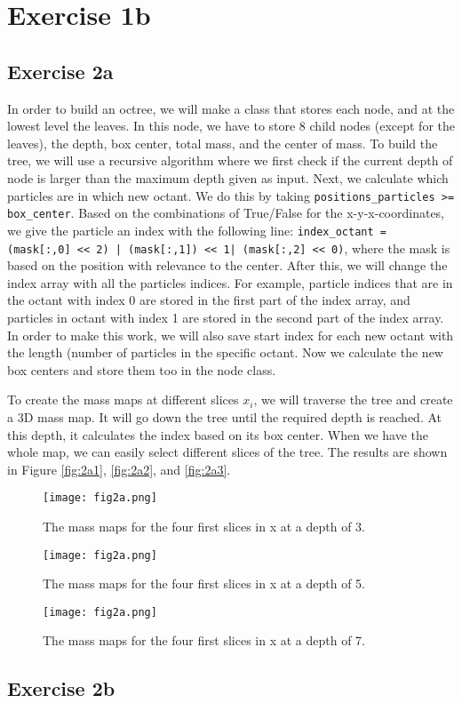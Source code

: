 \section{Exercise 1b}

\subsection{Exercise 2a}
In order to build an octree, we will make a class that stores each node, and at the lowest level the leaves. In this node, we have to store 8 child nodes (except for the leaves), the depth, box center, total mass, and the center of mass. To build the tree, we will use a recursive algorithm where we first check if the current depth of node is larger than the maximum depth given as input. Next, we calculate which particles are in which new octant. We do this by taking \texttt{positions_particles >= box_center}. Based on the combinations of True/False for the x-y-x-coordinates, we give the particle an index with the following line: \texttt{index_octant = (mask[:,0] << 2) | (mask[:,1]) << 1| (mask[:,2] << 0)}, where the mask is based on the position with relevance to the center. After this, we will change the index array with all the particles indices. For example, particle indices that are in the octant with index 0 are stored in the first part of the index array, and particles in octant with index 1 are stored in the second part of the index array. In order to make this work, we will also save start index for each new octant with the length (number of particles in the specific octant. Now we calculate the new box centers and store them too in the node class. 

To create the mass maps at different slices $x_i$, we will traverse the tree and create a 3D mass map. It will go down the tree until the required depth is reached. At this depth, it calculates the index based on its box center. When we have the whole map, we can easily select different slices of the tree. The results are shown in Figure \ref{fig:2a1}, \ref{fig:2a2}, and \ref{fig:2a3}.

\begin{figure}[h!]
  \centering
  \texttt{[image: fig2a.png]}
  \caption{The mass maps for the four first slices in x at a depth of 3.}
  \label{fig:2a_level3}
\end{figure}

\begin{figure}[h!]
  \centering
  \texttt{[image: fig2a.png]}
  \caption{The mass maps for the four first slices in x at a depth of 5.}
  \label{fig:2a_level5}
\end{figure}

\begin{figure}[h!]
  \centering
  \texttt{[image: fig2a.png]}
  \caption{The mass maps for the four first slices in x at a depth of 7.}
  \label{fig:2a_level7}
\end{figure}

\subsection{Exercise 2b}


